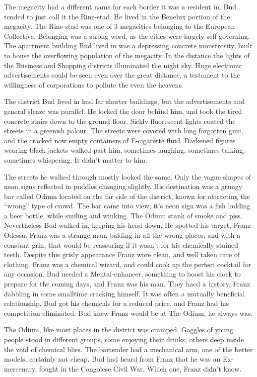 \documentclass{book}
\begin{document}
The megacity had a different name for each border it was a resident in. Bud tended to just call it the Rine-stad. He lived in the Benelux portion of the megacity. The Rine-stad was one of 3 megacities belonging to the European Collective. Belonging was a strong word, as the cities were largely self governing. The apartment building Bud lived in was a depressing concrete monstrosity, built to house the overflowing population of the megacity. In the distance the lights of the Business and Shopping districts illuminated the night sky. Huge electronic advertisements could be seen even over the great distance, a testament to the willingness of corporations to pollute the even the heavens.

The district Bud lived in had far shorter buildings, but the advertisements and general sleaze was parallel. He locked the door behind him, and took the tired concrete stairs down to the ground floor. Sickly fluorescent lights coated the streets in a greenish palour. The streets were covered with long forgotten gum, and the cracked now empty containers of E-cigarette fluid. Darkened figures wearing black jackets walked past him, sometimes laughing, sometimes talking, sometimes whispering. It didn't matter to him.

The streets he walked through mostly looked the same. Only the vague shapes of neon signs reflected in puddles changing slightly. His destination was a grungy bar called Odium located on the far side of the district, known for attracting the ``wrong'' type of crowd. The bar came into view, it's neon sign was a fish holding a beer bottle, while smiling and winking. The Odium stank of smoke and piss. Nevertheless Bud walked in, keeping his head down. He spotted his target, Franz Odessa. Franz was a strange man, balding in all the wrong places, and with a constant grin, that would be reassuring if it wasn't for his chemically stained teeth. Despite this grisly appearance Franz wore clean, and well taken care of clothing. Franz was a chemical wizard, and could cook up the perfect cocktail for any occasion. Bud needed a Mental-enhancer, something to boost his clock to prepare for the coming days, and Franz was his man. They hacd a history, Franz dabbling in some smalltime cracking himself. It was often a mutually beneficial relationship, Bud got his chemicals for a reduced price, and Franz had his competition eliminated. Bud knew Franz would be at The Odium, he always was.

The Odium, like most places in the district was cramped. Gaggles of young people stood in different groups, some enjoying their drinks, others deep inside the void of chemical bliss. The bartender had a mechanical arm, one of the better models, certainly not cheap. Bud had heard from Franz that he was an Ex-mercenary, fought in the Congolese Civil War. Which one, Franz didn't know.
\end{document}
